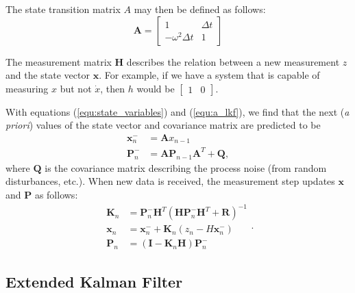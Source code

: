 \documentclass[]{article}
\begin{document}
The state transition matrix $A$ may then be defined as follows:
\begin{equation}
\boldsymbol{A} = \begin{bmatrix} 1 & \Delta t \\
                -\omega^{2}\Delta t & 1 \end{bmatrix}
\label{equ:a_lkf}
\end{equation}

The measurement matrix $\boldsymbol{H}$ describes the relation between a new measurement $z$ and the state vector $\boldsymbol{x}$. For example, if we have a system that is capable of measuring $x$ but not $\dot{x}$, then $h$ would be $\begin{bmatrix} 1 & 0 \end{bmatrix}$.

With equations (\ref{equ:state_variables}) and (\ref{equ:a_lkf}), we find that the next (\textit{a priori}) values of the state vector and covariance matrix are predicted to be
\begin{equation}
\begin{split}
\boldsymbol{x}_{n}^{-} & = \boldsymbol{A} x_{n-1} \\
\boldsymbol{P}_{n}^{-} & = \boldsymbol{A}\boldsymbol{P}_{n-1}\boldsymbol{A}^{T} + \boldsymbol{Q},
\end{split}
\label{equ:state_predict_lkf}
\end{equation}
where $\boldsymbol{Q}$ is the covariance matrix describing the process noise (from random disturbances, etc.). When new data is received, the measurement step updates $\boldsymbol{x}$ and $\boldsymbol{P}$ as follows:
\begin{equation}
\begin{split}
\boldsymbol{K}_{n} & = \boldsymbol{P}_{n}^{-} \boldsymbol{H}^{T}
(\boldsymbol{H} \boldsymbol{P}_{n}^{-} \boldsymbol{H}^{T}
+ \boldsymbol{R})^{-1} \\
\boldsymbol{x}_{n} & = \boldsymbol{x}_{n}^{-} + \boldsymbol{K}_{n} (z_{n} - H\boldsymbol{x}_{n}^{-}) \\
\boldsymbol{P}_{n} & = (\boldsymbol{I} - \boldsymbol{K}_{n}\boldsymbol{H}) \boldsymbol{P}_{n}^{-}
\end{split}.
\label{equ:state_measure_lkf}
\end{equation}

\subsection{Extended Kalman Filter}
\end{document}
